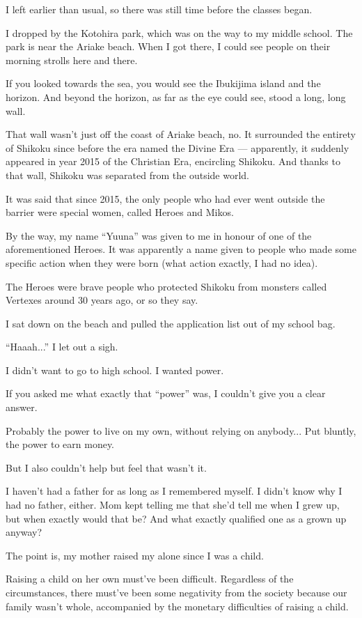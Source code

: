 I left earlier than usual, so there was still time before the classes began.

I dropped by the Kotohira park, which was on the way to my middle school. The park is near the Ariake beach. When I got there, I could see people on their morning strolls here and there.

If you looked towards the sea, you would see the Ibukijima island and the horizon. And beyond the horizon, as far as the eye could see, stood a long, long wall.

That wall wasn't just off the coast of Ariake beach, no. It surrounded the entirety of Shikoku since before the era named the Divine Era --- apparently, it suddenly appeared in year 2015 of the Christian Era, encircling Shikoku. And thanks to that wall, Shikoku was separated from the outside world.

It was said that since 2015, the only people who had ever went outside the barrier were special women, called Heroes and Mikos.

By the way, my name ``Yuuna'' was given to me in honour of one of the aforementioned Heroes. It was apparently a name given to people who made some specific action when they were born (what action exactly, I had no idea).

The Heroes were brave people who protected Shikoku from monsters called Vertexes around 30 years ago, or so they say.

I sat down on the beach and pulled the application list out of my school bag.

``Haaah...'' I let out a sigh.

I didn't want to go to high school. I wanted power.

If you asked me what exactly that ``power'' was, I couldn't give you a clear answer.

Probably the power to live on my own, without relying on anybody... Put bluntly, the power to earn money.

But I also couldn't help but feel that wasn't it.

I haven't had a father for as long as I remembered myself. I didn't know why I had no father, either. Mom kept telling me that she'd tell me when I grew up, but when exactly would that be? And what exactly qualified one as a grown up anyway?

The point is, my mother raised my alone since I was a child.

Raising a child on her own must've been difficult. Regardless of the circumstances, there must've been some negativity from the society because our family wasn't whole, accompanied by the monetary difficulties of raising a child.

